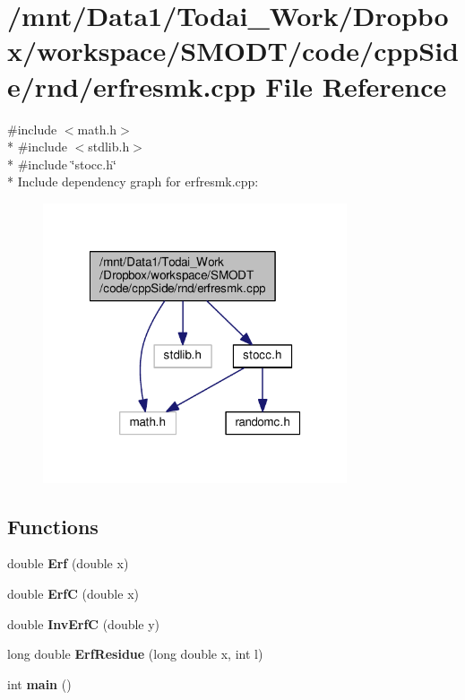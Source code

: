 \section{/mnt/\-Data1/\-Todai\-\_\-\-Work/\-Dropbox/workspace/\-S\-M\-O\-D\-T/code/cpp\-Side/rnd/erfresmk.cpp File Reference}
\label{rnd_2erfresmk_8cpp}
{\ttfamily \#include $<$math.\-h$>$}\\*
{\ttfamily \#include $<$stdlib.\-h$>$}\\*
{\ttfamily \#include \char`\"{}stocc.\-h\char`\"{}}\\*
Include dependency graph for erfresmk.\-cpp\-:\nopagebreak
\begin{figure}[H]
\begin{center}
\leavevmode
\includegraphics[width=254pt]{rnd_2erfresmk_8cpp__incl}
\end{center}
\end{figure}
\subsection*{Functions}
\begin{DoxyCompactItemize}
\item 
double {\bf Erf} (double x)
\item 
double {\bf Erf\-C} (double x)
\item 
double {\bf Inv\-Erf\-C} (double y)
\item 
long double {\bf Erf\-Residue} (long double x, int l)
\item 
int {\bf main} ()
\end{DoxyCompactItemize}
